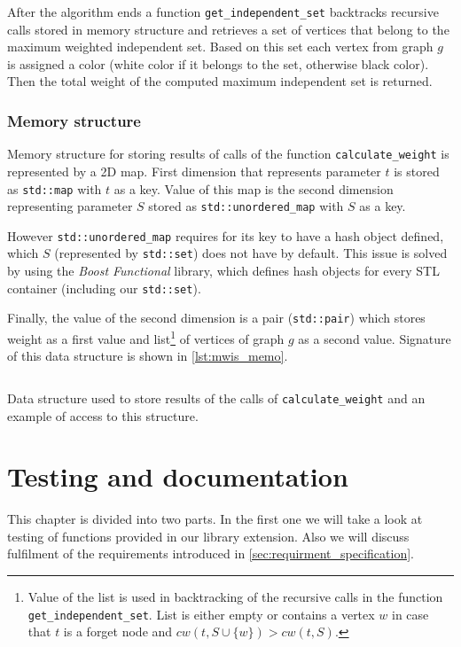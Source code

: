 \documentclass[thesis=B,english]{FITthesis}[2019/03/21]
\begin{document}
After the algorithm ends a function \texttt{get\_independent\_set} backtracks recursive calls stored in memory structure and retrieves a set of vertices that belong to the maximum weighted independent set. Based on this set each vertex from graph $g$ is assigned a color (white color if it belongs to the set, otherwise black color). Then the total weight of the computed maximum independent set is returned.

\subsection{Memory structure}\label{ssec:mwis_memo}
Memory structure for storing results of calls of the function \texttt{calculate\_weight} is represented by a 2D map. First dimension that represents parameter $t$ is stored as \texttt{std::map} with $t$ as a key. Value of this map is the second dimension representing parameter $S$ stored as \texttt{std::unordered\_map} with $S$ as a key.

However \texttt{std::unordered\_map} requires for its key to have a hash object defined, which $S$ (represented by \texttt{std::set}) does not have by default. This issue is solved by using the \emph{Boost Functional} library, which defines hash objects for every STL container (including our \texttt{std::set}).

Finally, the value of the second dimension is a pair (\texttt{std::pair}) which stores weight as a first value and list\footnote{Value of the list is used in backtracking of the recursive calls in the function \texttt{get\_independent\_set}. List is either empty or contains a vertex $w$ in case that $t$ is a forget node and $cw(t, S \cup \{w\}) > cw(t, S)$. } of vertices of graph $g$ as a second value. Signature of this data structure is shown in \autoref{lst:mwis_memo}.

\begin{listing}[H]
	\inputminted[tabsize=2,breaklines,bgcolor=codebg]{c++}{snippets/mwis_memo.m}
	\caption[Data structure used to store results of calls of \texttt{calculate\_weight}]{Data structure used to store results of the calls of \texttt{calculate\_weight} and an example of access to this structure.}
	\label{lst:mwis_memo}
\end{listing}

\chapter{Testing and documentation}\label{chap:testing}
This chapter is divided into two parts. In the first one we will take a look at testing of functions provided in our library extension. Also we will discuss fulfilment of the requirements introduced in \autoref{sec:requirment_specification}.
\end{document}
